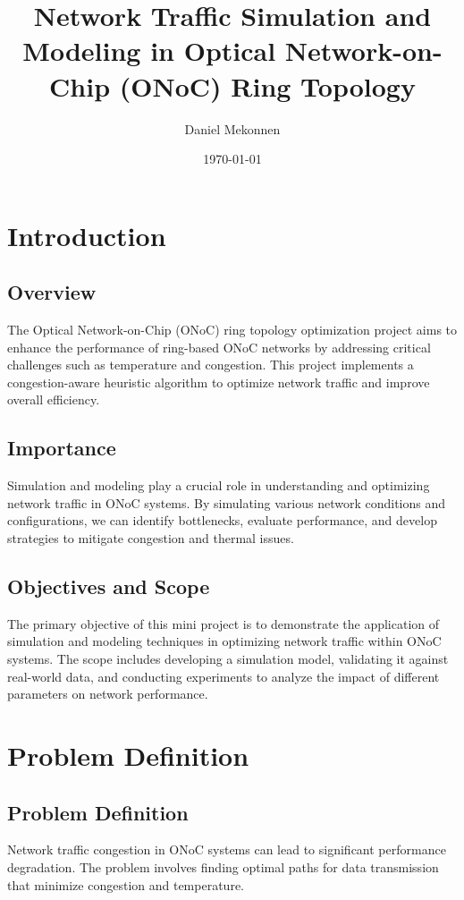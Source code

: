 \documentclass[12pt]{article}
\title{Network Traffic Simulation and Modeling in Optical Network-on-Chip (ONoC) Ring Topology}
\author{Daniel Mekonnen}
\date{\today}
\begin{document}
\maketitle

\tableofcontents

\section{Introduction}
\subsection{Overview}
The Optical Network-on-Chip (ONoC) ring topology optimization project aims to enhance the performance of ring-based ONoC networks by addressing critical challenges such as temperature and congestion. This project implements a congestion-aware heuristic algorithm to optimize network traffic and improve overall efficiency.

\subsection{Importance}
Simulation and modeling play a crucial role in understanding and optimizing network traffic in ONoC systems. By simulating various network conditions and configurations, we can identify bottlenecks, evaluate performance, and develop strategies to mitigate congestion and thermal issues.

\subsection{Objectives and Scope}
The primary objective of this mini project is to demonstrate the application of simulation and modeling techniques in optimizing network traffic within ONoC systems. The scope includes developing a simulation model, validating it against real-world data, and conducting experiments to analyze the impact of different parameters on network performance.

\section{Problem Definition}
\subsection{Problem Definition}
Network traffic congestion in ONoC systems can lead to significant performance degradation. The problem involves finding optimal paths for data transmission that minimize congestion and temperature.
\end{document}
